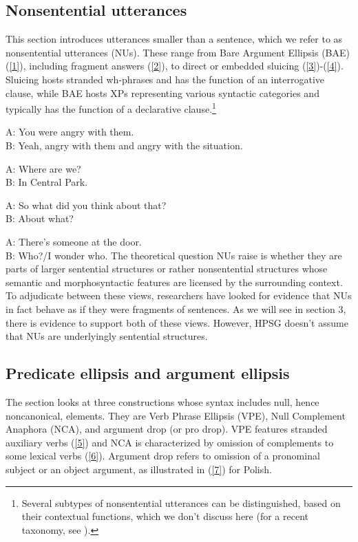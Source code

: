\documentclass[output=paper
                ,modfonts
                ,nonflat
	        ,collection
	        ,collectionchapter
	        ,collectiontoclongg
 	        ,biblatex
                ,babelshorthands
                ,newtxmath
                ,draftmode
                ,colorlinks, citecolor=brown
]{./langsci/langscibook}
\begin{document}
{\subsection{Nonsentential utterances}
This section introduces utterances smaller than a sentence, which we refer to as nonsentential utterances (NUs). These range from Bare Argument Ellipsis (BAE) (\ref{1}), including fragment answers (\ref{2}), to direct or embedded sluicing (\ref{3})-(\ref{4}). Sluicing hosts stranded wh-phrases and has the function of an interrogative clause, while BAE hosts XPs representing various syntactic categories and typically has the function of a declarative clause.\footnote{Several subtypes of nonsentential utterances can be distinguished, based on their contextual functions, which we don't discuss here (for a recent taxonomy, see \citealt{Ginzburg2011}).}



\ea A: You were angry with them.\\ B: Yeah, angry with them and angry with the situation.\label{1}\z

\ea A: Where are we? \\B: In Central Park.\label{2}\z

\ea A: So what did you think about that?\\ B: About what? \label{3}\z

\ea A: There's someone at the door. \\B: Who?/I wonder who. \label{4}\z
The theoretical question NUs raise is whether they are parts of larger sentential structures or rather nonsentential structures whose semantic and morphosyntactic features are licensed by the surrounding context. To adjudicate between these views, researchers have looked for evidence that NUs in fact behave as if they were fragments of sentences. As we will see in section 3, there is evidence to support both of these views. However, HPSG doesn't assume that NUs are underlyingly sentential structures.

\subsection{Predicate ellipsis and argument ellipsis}
The section looks at three constructions whose syntax includes null, hence noncanonical, elements. They are Verb Phrase Ellipsis (VPE), Null Complement Anaphora (NCA), and argument drop (or pro drop). VPE features stranded auxiliary verbs (\ref{5}) and NCA is characterized by omission of complements to some lexical verbs (\ref{6}). Argument drop refers to omission of a pronominal subject or an object argument, as illustrated in (\ref{7}) for Polish.

}
\end{document}
